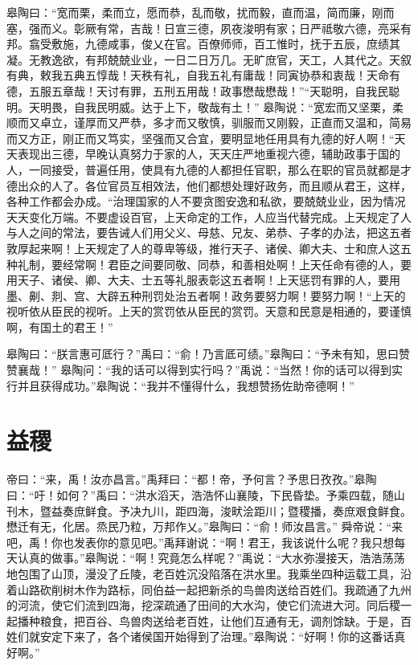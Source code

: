 \documentclass[a4paper,12pt,UTF8,twoside]{ctexbook}
\begin{document}
皋陶曰：“宽而栗，柔而立，愿而恭，乱而敬，扰而毅，直而温，简而廉，刚而塞，强而义。彰厥有常，吉哉！日宣三德，夙夜浚明有家；日严祗敬六德，亮采有邦。翕受敷施，九德咸事，俊乂在官。百僚师师，百工惟时，抚于五辰，庶绩其凝。无教逸欲，有邦兢兢业业，一日二日万几。无旷庶官，天工，人其代之。天叙有典，敕我五典五惇哉！天秩有礼，自我五礼有庸哉！同寅协恭和衷哉！天命有德，五服五章哉！天讨有罪，五刑五用哉！政事懋哉懋哉！”“天聪明，自我民聪明。天明畏，自我民明威。达于上下，敬哉有土！”
皋陶说：“宽宏而又坚栗，柔顺而又卓立，谨厚而又严恭，多才而又敬慎，驯服而又刚毅，正直而又温和，简易而又方正，刚正而又笃实，坚强而又合宜，要明显地任用具有九德的好人啊！“天天表现出三德，早晚认真努力于家的人，天天庄严地重视六德，辅助政事于国的人，一同接受，普遍任用，使具有九德的人都担任官职，那么在职的官员就都是才德出众的人了。各位官员互相效法，他们都想处理好政务，而且顺从君王，这样，各种工作都会办成。“治理国家的人不要贪图安逸和私欲，要兢兢业业，因为情况天天变化万端。不要虚设百官，上天命定的工作，人应当代替完成。上天规定了人与人之间的常法，要告诫人们用父义、母慈、兄友、弟恭、子孝的办法，把这五者敦厚起来啊！上天规定了人的尊卑等级，推行天子、诸侯、卿大夫、士和庶人这五种礼制，要经常啊！君臣之间要同敬、同恭，和善相处啊！上天任命有德的人，要用天子、诸侯、卿、大夫、士五等礼服表彰这五者啊！上天惩罚有罪的人，要用墨、劓、剕、宫、大辟五种刑罚处治五者啊！政务要努力啊！要努力啊！“上天的视听依从臣民的视听。上天的赏罚依从臣民的赏罚。天意和民意是相通的，要谨慎啊，有国土的君王！”

皋陶曰：“朕言惠可厎行？”禹曰：“俞！乃言厎可绩。”皋陶曰：“予未有知，思曰赞赞襄哉！”
皋陶问：“我的话可以得到实行吗？”禹说：“当然！你的话可以得到实行并且获得成功。”皋陶说：“我并不懂得什么，我想赞扬佐助帝德啊！”

\chapter{益稷}

帝曰：“来，禹！汝亦昌言。”禹拜曰：“都！帝，予何言？予思日孜孜。”皋陶曰：“吁！如何？”禹曰：“洪水滔天，浩浩怀山襄陵，下民昏垫。予乘四载，随山刊木，暨益奏庶鲜食。予决九川，距四海，浚畎浍距川；暨稷播，奏庶艰食鲜食。懋迁有无，化居。烝民乃粒，万邦作乂。”皋陶曰：“俞！师汝昌言。”
舜帝说：“来吧，禹！你也发表你的意见吧。”禹拜谢说：“啊！君王，我该说什么呢？我只想每天认真的做事。”皋陶说：“啊！究竟怎么样呢？”禹说：“大水弥漫接天，浩浩荡荡地包围了山顶，漫没了丘陵，老百姓沉没陷落在洪水里。我乘坐四种运载工具，沿着山路砍削树木作为路标，同伯益一起把新杀的鸟兽肉送给百姓们。我疏通了九州的河流，使它们流到四海，挖深疏通了田间的大水沟，使它们流进大河。同后稷一起播种粮食，把百谷、鸟兽肉送给老百姓，让他们互通有无，调剂馀缺。于是，百姓们就安定下来了，各个诸侯国开始得到了治理。”皋陶说：“好啊！你的这番话真好啊。”
\end{document}
